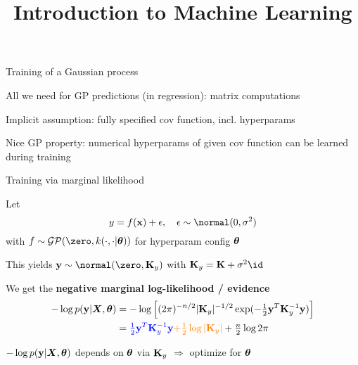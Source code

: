 \documentclass[11pt,compress,t,notes=noshow, xcolor=table]{beamer}
\title{Introduction to Machine Learning}
\begin{document}

\begin{framei}[sep=L]{Training of a Gaussian process}
\item All we need for GP predictions (in regression): matrix computations
\item Implicit assumption: fully specified cov function, incl. hyperparams
\item Nice GP property: numerical hyperparams of given cov function can be learned during training
\end{framei}

\begin{framei}[sep=L]{Training via marginal likelihood}
\item Let $$y = \fx + \epsilon, \quad \epsilon \sim \normal(0, \sigma^2)$$
with $f \sim \mathcal{GP}(\zero, k(\cdot, \cdot | \thetav))$ for hyperparam config $\bm{\theta}$
\item This yields $\yv \sim \normal(\zero, \Ky )$ with  $\Ky = \Kmat + \sigma^2 \id$
\item We get the \textbf{negative marginal log-likelihood / evidence}
\begin{eqnarray*}
-\log p(\mathbf{y} | \bm{X}, \bm{\theta}) &= -\log \left[(2 \pi )^{-n / 2} |\mathbf{K}_y|^{-1 / 2} \exp(- \tfrac{1}{2} \mathbf{y}^T \mathbf{K}_y^{-1} \mathbf{y}) \right] \\
&= \textcolor{blue}{\tfrac{1}{2} \mathbf{y}^T \mathbf{K}_y^{-1} \mathbf{y}} \textcolor{orange}{+ \tfrac{1}{2} \log | \mathbf{K}_y |}  + \tfrac{n}{2} \log 2 \pi
\end{eqnarray*}
\item $-\log p(\mathbf{y} | \bm{X}, \bm{\theta})$ depends on $\bm{\theta}$ via $\mathbf{K}_y$ $\Rightarrow$ optimize for $\bm{\theta}$
\end{framei}
\end{document}
